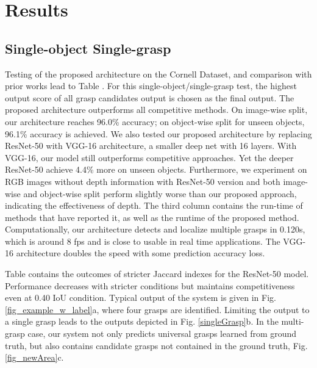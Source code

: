 \documentclass[letterpaper, 10 pt, journal, twoside]{IEEEtran}
\begin{document}
\section{Results}

\subsection{Single-object Single-grasp}
Testing of the proposed architecture on the Cornell Dataset, and
comparison with prior works lead to Table .  
For this single-object/single-grasp test, the highest output score of
all grasp candidates output is chosen as the final output.
The proposed architecture outperforms all competitive methods. On image-wise
split, our architecture reaches 96.0\% accuracy; on object-wise split for
unseen objects, 96.1\% accuracy is achieved.  
We also tested our proposed architecture by replacing ResNet-50 with VGG-16
architecture, a smaller deep net with 16 layers. With VGG-16, our model
still outperforms competitive approaches. Yet the deeper ResNet-50 achieve
4.4\% more on unseen objects.
Furthermore, we experiment on RGB images without depth information with ResNet-50 version and both image-wise and object-wise split perform slightly worse than our proposed approach, indicating the effectiveness of depth.
The third column contains the run-time of methods that have reported it, as
well as the runtime of the proposed method.  Computationally, our
architecture detects and localize multiple grasps in 0.120s, which is around
8 fps and is close to usable in real time applications.  The VGG-16
architecture doubles the speed with some prediction accuracy loss.

Table  contains the outcomes of stricter Jaccard indexes for
the ResNet-50 model. Performance decreases with stricter conditions but maintains competitiveness even at 0.40 IoU condition.
Typical output of the system is given in Fig. \ref{fig_example_w_label}a,
where four grasps are identified.  Limiting the output to a single grasp
leads to the outputs depicted in Fig.  \ref{singleGrasp}b. 
In the multi-grasp case, our system not only predicts universal grasps
learned from ground truth, but also contains candidate grasps not contained 
in the ground truth, Fig. \ref{fig_newArea}c.
\end{document}
